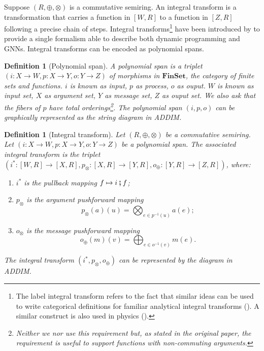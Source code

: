 \documentclass[11pt,a4paper,openright,twoside]{report}
\theoremstyle{plain}
\newtheorem{definition}[proposition]{Definition}
\theoremstyle{definition}
\begin{document}
Suppose $(R, \oplus, \otimes)$ is a commutative semiring. An integral transform is a transformation that carries a function in $[W,R]$ to a function in $[Z,R]$ following a precise chain of steps. Integral transforms\footnote{The label integral transform refers to the fact that similar ideas can be used to write categorical definitions for familiar analytical integral transforms (\cite{golem_ph_utexas_edu}). A similar construct is also used in physics (\cite{eastwood1980cohomology}).} have been introduced by \cite{dudzik2022graph} to provide a single formalism able to describe both dynamic programming and GNNs. Integral transforms can be encoded as polynomial spans.

\begin{definition}[Polynomial span]
  A polynomial span is a triplet $(i: X \to W,p: X \to Y,o: Y \to Z)$ of morphisms in $\mathbf{FinSet}$, the category of finite sets and functions. $i$ is known as input, $p$ as process, $o$ as ouput. $W$ is known as input set, $X$ as argument set, $Y$ as message set, $Z$ as ouput set. We also ask that the fibers of $p$ have total orderings\footnote{Neither we nor \cite{dudzik2022graph} use this requirement but, as stated in the original paper, the requirement is useful to support functions with non-commuting arguments.}. The polynomial span $(i,p,o)$ can be graphically represented as the string diagram in ADDIM.
\end{definition}

\begin{definition}[Integral transform]
  Let $(R, \oplus, \otimes)$ be a commutative semiring. Let $(i: X \to W,p: X \to Y,o: Y \to Z)$ be a polynomial span. The associated integral transform is the triplet $(i^*: [W,R] \to [X,R], p_{\otimes}: [X,R] \to [Y,R], o_{\oplus}: [Y,R] \to [Z,R])$, where:
  \begin{enumerate}
    \item $i^*$ is the pullback mapping $f \mapsto i \fatsemi f$;
    \item $p_{\otimes}$ is the argument pushforward mapping 
    \[p_{\otimes}(a)(u) = \bigotimes_{e \in p^{-1}(u)}a(e);\]
    \item $o_{\otimes}$ is the message pushforward mapping 
    \[o_{\oplus}(m)(v) = \bigoplus_{e \in o^{-1}(v)}m(e).\]
  \end{enumerate}
  The integral transform $(i^*, p_{\otimes}, o_{\oplus})$ can be represented by the diagram in ADDIM.
\end{definition}
\end{document}
